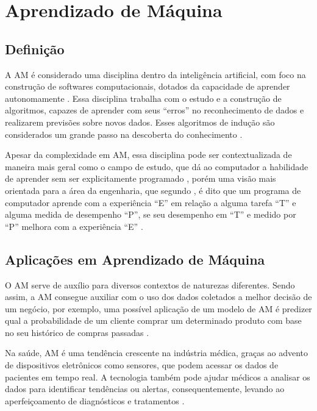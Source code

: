 \chapter{Aprendizado de Máquina}
\section{Definição}
A AM é considerado uma disciplina dentro da inteligência artificial, com foco na construção de softwares computacionais, dotados da capacidade de aprender autonomamente \cite{Hosch}. Essa disciplina trabalha com o estudo e a construção de algoritmos, capazes de aprender com seus “erros” no reconhecimento de dados e realizarem previsões sobre novos dados. Esses algoritmos de indução são considerados um grande passo na descoberta do conhecimento \cite{Kohavi}.

Apesar da complexidade em AM, essa disciplina pode ser contextualizada de maneira mais geral como o campo de estudo, que dá ao computador a habilidade de aprender sem ser explicitamente programado \cite{Arthur}, porém uma visão mais orientada para a área da engenharia, que segundo , é dito que um programa de computador aprende com a experiência “E” em relação a alguma tarefa “T” e alguma medida de desempenho “P”, se seu desempenho em “T” e medido por “P” melhora com a experiência “E” \cite{Tom}.

\section{Aplicações em Aprendizado de Máquina}
O AM serve de auxílio para diversos contextos de naturezas diferentes. Sendo assim, a AM consegue auxiliar com o uso dos dados coletados a melhor decisão de um negócio, por exemplo, uma possível aplicação de um modelo de AM é predizer qual a probabilidade de um cliente comprar um determinado produto com base no seu histórico de compras passadas \cite{Amazon}.

Na saúde, AM é uma tendência crescente na indústria médica, graças ao advento de dispositivos eletrônicos como sensores, que podem acessar os dados de pacientes em tempo real. A tecnologia também pode ajudar médicos a analisar os dados para identificar tendências ou alertas, consequentemente, levando ao aperfeiçoamento de diagnósticos e tratamentos \cite{Sas}.

